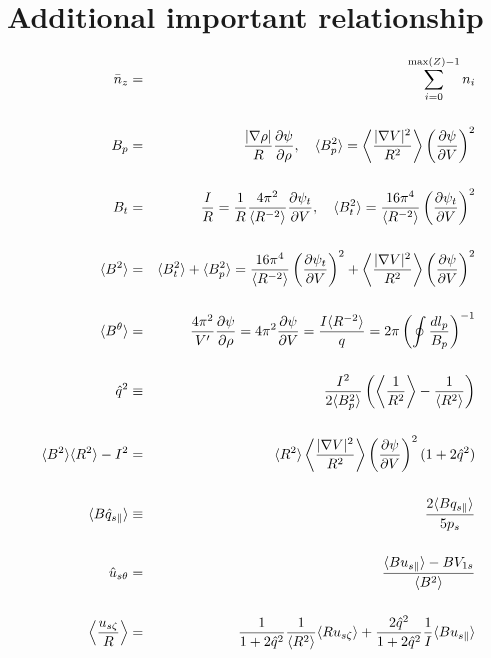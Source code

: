 \documentclass[11pt]{article}
\def\r#1{{\rm#1}}
\def\ave#1{\left\langle#1\right\rangle}
\def\aves#1{\langle#1\rangle}
\def\dd#1#2{\frac{\partial #1}{\partial #2}}
\def\para{\parallel}
\def\psit{\psi_t}
\def\uszt{u_{s\zeta}}
\def\bri{\aves{B^2}\aves{R^2} - I^2}
\def\uspara{u_{s\para}}
\def\nnz{\bar{n}_{z}}
\begin{document}
\bigskip

\section{Additional important relationship}
\setcounter{equation}{0}

\begin{eqnarray}
  \nnz &=&
%
 \sum_{i=0}^{\r{max}(Z)-1} n_i
\\[5mm]
  B_p &=&
%
  \frac{|\nabla\rho|}{R} \dd{\psi}{\rho},
  \quad
  \aves{B_p^2} =
%
  \ave{\frac{|\nabla V|^2}{R^2}} \left(\dd{\psi}{V}\right)^2
\\[5mm]
  B_t &=&
%
  \frac{I}{R}
%
  = \frac{1}{R} \frac{4\pi^2}{\aves{R^{-2}}} \dd{\psit}{V},
  \quad
  \aves{B_t^2} =
%
  \frac{16\pi^4}{\aves{R^{-2}}} \left(\dd{\psit}{V}\right)^2
\\[5mm]
  \aves{B^2} &=&
%
  \aves{B_t^2} + \aves{B_p^2}
%
  = \frac{16\pi^4}{\aves{R^{-2}}}\left(\dd{\psit}{V}\right)^2
  + \ave{\frac{|\nabla V|^2}{R^2}}\left(\dd{\psi}{V}\right)^2
\\[5mm]
  \aves{B^\theta} &=&
%
  \frac{4\pi^2}{V'} \dd{\psi}{\rho}
%
  = 4\pi^2 \dd{\psi}{V}
%
  = \frac{I\aves{R^{-2}}}{q}
%
  = 2\pi\left(\oint \frac{dl_p}{B_p}\right)^{-1}
\\[5mm]
  \hat{q}^2 &\equiv& \frac{I^2}{2\aves{B_p^2}}\left(\ave{\frac{1}{R^2}}-\frac{1}{\aves{R^2}}\right)
\\[5mm]
  \bri &=&
%
  \aves{R^2} \ave{\frac{|\nabla V|^2}{R^2}} \left(\dd{\psi}{V}\right)^2 (1+2\hat{q}^2)
\\[5mm]
 \aves{B\hat{q}_{s\para}} &\equiv&
%
 \frac{2\aves{Bq_{s\para}}}{5p_s}
\\[5mm]
  \hat{u}_{s\theta} &=&
%
  \frac{\aves{B\uspara} - BV_{1s}}{ \aves{B^2} }
\\[5mm]
  \ave{\frac{\uszt}{R}} &=&
%
  \frac{1}{1+2\hat{q}^2}\frac{1}{\aves{R^2}}\aves{R\uszt}+\frac{2\hat{q}^2}{1+2\hat{q}^2}\frac{1}{I}\aves{B\uspara}

\end{eqnarray}
\end{document}
